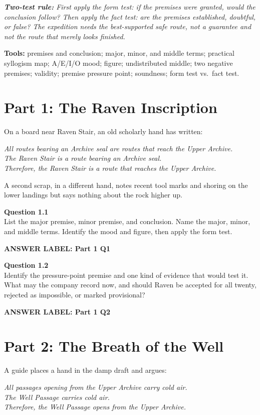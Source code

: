 \documentclass[12pt]{article}
\newcommand{\answerbox}[2]{\par\vspace{0.1em}\noindent\textbf{#1}\par\vspace{0.03em}\noindent\fbox{\begin{minipage}[t][#2]{\dimexpr\textwidth-2\fboxsep-2\fboxrule}\rule{\textwidth}{0pt}\vspace{#2}\end{minipage}}\par\vspace{0.18em}}
\newcommand{\cluebox}[1]{\par\vspace{0.12em}\noindent\begin{minipage}{\textwidth}\itshape #1\end{minipage}\par\vspace{0.12em}}
\begin{document}
\cluebox{\textbf{Two-test rule:} First apply the \emph{form test}: if the premises were granted, would the conclusion follow? Then apply the \emph{fact test}: are the premises established, doubtful, or false? The expedition needs the \emph{best-supported safe route}, not a guarantee and not the route that merely looks finished.}

\textbf{Tools:} premises and conclusion; major, minor, and middle terms; practical syllogism map; A/E/I/O mood; figure; undistributed middle; two negative premises; validity; premise pressure point; soundness; form test vs.\ fact test.
\newpage
\section*{Part 1: The Raven Inscription}
On a board near Raven Stair, an old scholarly hand has written:

\cluebox{All routes bearing an Archive seal are routes that reach the Upper Archive.\\
The Raven Stair is a route bearing an Archive seal.\\
Therefore, the Raven Stair is a route that reaches the Upper Archive.}

A second scrap, in a different hand, notes recent tool marks and shoring on the lower landings but says nothing about the rock higher up.

\textbf{Question 1.1}\\[-0.15em]
List the major premise, minor premise, and conclusion. Name the major, minor, and middle terms. Identify the mood and figure, then apply the form test.
\answerbox{ANSWER LABEL: Part 1 Q1}{2.25in}

\textbf{Question 1.2}\\[-0.15em]
Identify the pressure-point premise and one kind of evidence that would test it. What may the company record now, and should Raven be accepted for all twenty, rejected as impossible, or marked provisional?
\answerbox{ANSWER LABEL: Part 1 Q2}{1.65in}

\newpage
\section*{Part 2: The Breath of the Well}
A guide places a hand in the damp draft and argues:

\cluebox{All passages opening from the Upper Archive carry cold air.\\
The Well Passage carries cold air.\\
Therefore, the Well Passage opens from the Upper Archive.}
\end{document}
